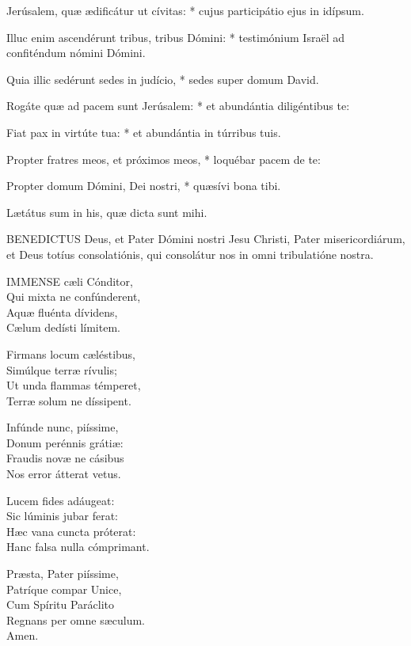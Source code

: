 Jerúsalem, quæ ædificátur ut cívitas: * cujus participátio ejus in idípsum.

Illuc enim ascendérunt tribus, tribus Dómini: * testimónium Israël ad confiténdum nómini Dómini.

Quia illic sedérunt sedes in judício, * sedes super domum David.

Rogáte quæ ad pacem sunt Jerúsalem: * et abundántia diligéntibus te:

Fiat pax in virtúte tua: * et abundántia in túrribus tuis.

Propter fratres meos, et próximos meos, * loquébar pacem de te:

Propter domum Dómini, Dei nostri, * quæsívi bona tibi.

 Lætátus sum in his, quæ dicta sunt mihi.




\lettrine[lines=2]{B}{ENEDICTUS} Deus, et Pater Dómini nostri Jesu Christi, Pater misericordiárum, et Deus totíus consolatiónis, qui consolátur nos in omni tribulatióne nostra.


\lettrine[lines=2]{I}{MMENSE} cæli Cónditor,\\
Qui mixta ne confúnderent,\\
Aquæ fluénta dívidens,\\
Cælum dedísti límitem.

Firmans locum cæléstibus,\\
Simúlque terræ rívulis;\\
Ut unda flammas témperet,\\
Terræ solum ne díssipent.

Infúnde nunc, piíssime,\\
Donum perénnis grátiæ:\\
Fraudis novæ ne cásibus\\
Nos error átterat vetus.

Lucem fides adáugeat:\\
Sic lúminis jubar ferat:\\
Hæc vana cuncta próterat:\\
Hanc falsa nulla cómprimant.

Præsta, Pater piíssime,\\
Patríque compar Unice,\\
Cum Spíritu Paráclito\\
Regnans per omne sæculum.\\
Amen.

